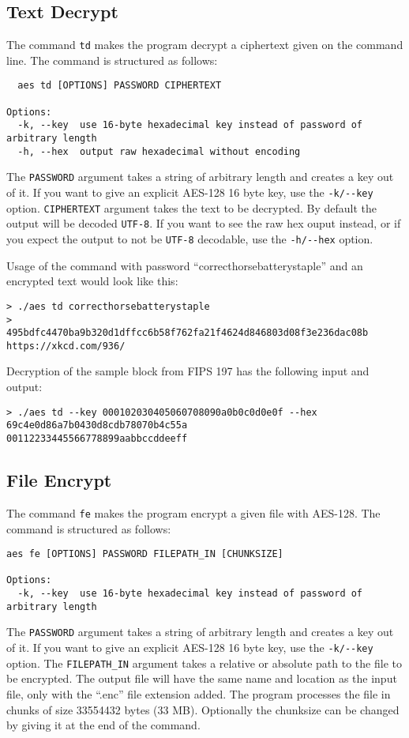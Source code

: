 \subsection{Text Decrypt}
The command \lstinline{td} makes the program decrypt a ciphertext given on the command line. The command is structured as follows:
\begin{lstlisting}
  aes td [OPTIONS] PASSWORD CIPHERTEXT

Options:
  -k, --key  use 16-byte hexadecimal key instead of password of arbitrary length
  -h, --hex  output raw hexadecimal without encoding
\end{lstlisting}
The \lstinline{PASSWORD} argument takes a string of arbitrary length and creates a key out of it. If you want to give an explicit AES-128 16 byte key, use the \lstinline{-k/--key} option. \lstinline{CIPHERTEXT} argument takes the text to be decrypted. By default the output will be decoded \lstinline{UTF-8}. If you want to see the raw hex ouput instead, or if you expect the output to not be \lstinline{UTF-8} decodable, use the \lstinline{-h/--hex} option.

Usage of the command with password \enquote{correcthorsebatterystaple} and an encrypted text would look like this:
\begin{lstlisting}
> ./aes td correcthorsebatterystaple
>      495bdfc4470ba9b320d1dffcc6b58f762fa21f4624d846803d08f3e236dac08b
https://xkcd.com/936/
\end{lstlisting}

Decryption of the sample block from FIPS 197 \cite{aes2001} has the following input and output:
\begin{lstlisting}
> ./aes td --key 000102030405060708090a0b0c0d0e0f --hex 69c4e0d86a7b0430d8cdb78070b4c55a
00112233445566778899aabbccddeeff
\end{lstlisting}


\subsection{File Encrypt}
The command \lstinline{fe} makes the program encrypt a given file with AES-128. The command is structured as follows:
\begin{lstlisting}
aes fe [OPTIONS] PASSWORD FILEPATH_IN [CHUNKSIZE]

Options:
  -k, --key  use 16-byte hexadecimal key instead of password of arbitrary length
\end{lstlisting}
The \lstinline{PASSWORD} argument takes a string of arbitrary length and creates a key out of it. If you want to give an explicit AES-128 16 byte key, use the \lstinline{-k/--key} option. The \lstinline{FILEPATH_IN} argument takes a relative or absolute path to the file to be encrypted. The output file will have the same name and location as the input file, only with the \enquote{.enc} file extension added. The program processes the file in chunks of size 33554432 bytes (33 MB). Optionally the chunksize can be changed by giving it at the end of the command.

